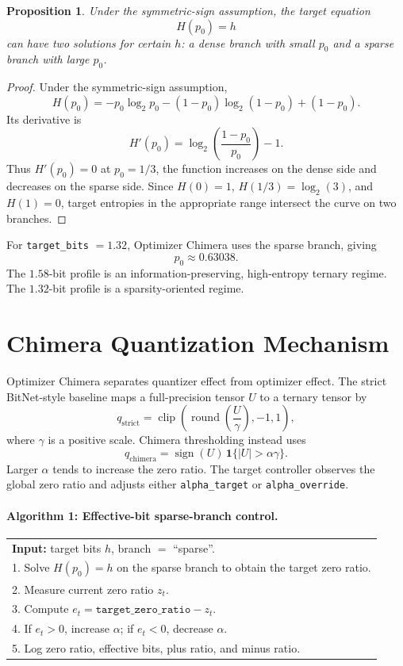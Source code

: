 \documentclass[11pt]{article}
\newtheorem{proposition}{Proposition}
\newcommand{\sgn}{\operatorname{sign}}
\newcommand{\clip}{\operatorname{clip}}
\begin{document}
\begin{proposition}
Under the symmetric-sign assumption, the target equation
\[
H(p_0)=h
\]
can have two solutions for certain $h$: a dense branch with small $p_0$ and a sparse branch with large $p_0$.
\end{proposition}

\begin{proof}
Under the symmetric-sign assumption,
\[
H(p_0)= -p_0\log_2 p_0 -(1-p_0)\log_2(1-p_0)+(1-p_0).
\]
Its derivative is
\[
H'(p_0)=\log_2\left(\frac{1-p_0}{p_0}\right)-1.
\]
Thus $H'(p_0)=0$ at $p_0=1/3$, the function increases on the dense side and decreases on the sparse side. Since $H(0)=1$, $H(1/3)=\log_2(3)$, and $H(1)=0$, target entropies in the appropriate range intersect the curve on two branches.
\end{proof}

For \texttt{target\_bits} $=1.32$, Optimizer Chimera uses the sparse branch, giving
\[
p_0 \approx 0.63038.
\]
The $1.58$-bit profile is an information-preserving, high-entropy ternary regime. The $1.32$-bit profile is a sparsity-oriented regime.

\section{Chimera Quantization Mechanism}

Optimizer Chimera separates quantizer effect from optimizer effect. The strict BitNet-style baseline maps a full-precision tensor $U$ to a ternary tensor by
\[
q_{\mathrm{strict}}=\clip\left(\operatorname{round}\left(\frac{U}{\gamma}\right),-1,1\right),
\]
where $\gamma$ is a positive scale. Chimera thresholding instead uses
\[
q_{\mathrm{chimera}}
=\sgn(U)\,\mathbf{1}\{|U|>\alpha\gamma\}.
\]
Larger $\alpha$ tends to increase the zero ratio. The target controller observes the global zero ratio and adjusts either \texttt{alpha\_target} or \texttt{alpha\_override}.

\paragraph{Algorithm 1: Effective-bit sparse-branch control.}
\begin{center}
\begin{tabular}{p{}}
\toprule
\textbf{Input:} target bits $h$, branch $=$ ``sparse''.\\
1. Solve $H(p_0)=h$ on the sparse branch to obtain the target zero ratio.\\
2. Measure current zero ratio $z_t$.\\
3. Compute $e_t=\texttt{target\_zero\_ratio}-z_t$.\\
4. If $e_t>0$, increase $\alpha$; if $e_t<0$, decrease $\alpha$.\\
5. Log zero ratio, effective bits, plus ratio, and minus ratio.\\
\bottomrule
\end{tabular}
\end{center}
\end{document}
